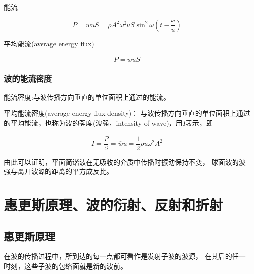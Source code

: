 \documentclass[12pt, a4paper]{article}
\numberwithin{equation}{section}
\begin{document}
    能流

    \begin{equation}
        P=w u S=\rho A^2 \omega^2 u S \sin ^2 \omega\left(t-\frac{x}{u}\right)
    \end{equation}

    平均能流(average energy flux)

    \begin{equation}
        \overline{P}=\overline{w} u S
    \end{equation}

\subsubsection{波的能流密度}

    能流密度:与波传播方向垂直的单位面积上通过的能流。

    平均能流密度(average energy flux density)：
    与波传播方向垂直的单位面积上通过的平均能流，也称为波的强度(波强，intensity of wave)，用\(I \)表示，即

    \begin{equation}
        I=\frac{\overline{P}}{S}=\overline{w} u=\frac{1}{2} \rho u \omega^2 A^2
    \end{equation}

    由此可以证明，平面简谐波在无吸收的介质中传播时振动保持不变，
    球面波的波强与离开波源的距离的平方成反比。

\section{惠更斯原理、波的衍射、反射和折射}

\subsection{惠更斯原理}

    在波的传播过程中，所到达的每一点都可看作是发射子波的波源，
    在其后的任一时刻，这些子波的包络面就是新的波前。
\end{document}
